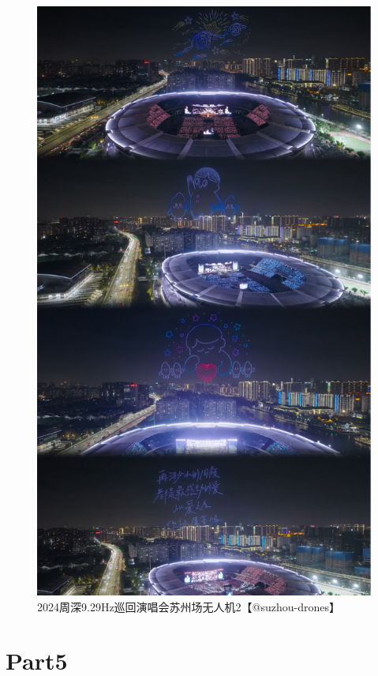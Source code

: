 \documentclass[]{ctexbook}
\begin{document}
\begin{figure}

{\centering \includegraphics[width=400pt]{img/suzhou20241109/002} 

}

\caption{2024周深9.29Hz巡回演唱会苏州场无人机2【@suzhou-drones】}\label{fig:unnamed-chunk-132}
\end{figure}

\section{Part5}\label{suzhou-20241109-part5}
\end{document}
